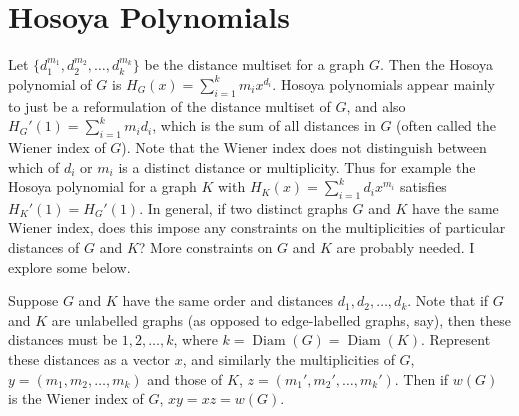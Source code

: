 \documentclass[12]{article}
\DeclareMathOperator{\diam}{Diam}
\newtheorem{question}{Question}
\theoremstyle{definition}
\begin{document}

	
	
	\iffalse
	\section{Hosoya Polynomials}
	
	
	Let $\{d_1^{m_1},d_2^{m_2}, \ldots, d_{k}^{m_k}\}$ be the distance multiset for a graph $G$.  Then the Hosoya polynomial of $G$ is $H_G(x) = \sum_{i=1}^k m_ix^{d_i}$.  Hosoya polynomials appear mainly to just be a reformulation of the distance multiset of $G$, and also $H_G'(1) = \sum_{i=1}^k m_id_i$, which is the sum of all distances in $G$ (often called the Wiener index of $G$).  Note that the Wiener index does not distinguish between which of $d_i$ or $m_i$ is a distinct distance or multiplicity.  Thus for example the Hosoya polynomial for a graph $K$ with $H_K(x) = \sum_{i = 1}^k d_ix^{m_i}$ satisfies $H_K'(1) = H_G'(1)$.  In general, if two distinct graphs $G$ and $K$ have the same Wiener index, does this impose any constraints on the multiplicities of particular distances of $G$ and $K$?  More constraints on $G$ and $K$ are probably needed.  I explore some below.
	
	Suppose $G$ and $K$ have the same order and distances $d_1, d_2, \ldots, d_k$.  Note that if $G$ and $K$ are unlabelled graphs (as opposed to edge-labelled graphs, say), then these distances must be $1, 2, \ldots, k$, where $k = \diam(G) = \diam(K)$.  Represent these distances as a vector $x$, and similarly the multiplicities of $G$, $y = (m_1, m_2, \ldots, m_k)$ and those of $K$, $z = (m_1', m_2', \ldots, m_k')$.  Then if $w(G)$ is the Wiener index of $G$, $xy = xz = w(G)$.  
	
\end{document}
